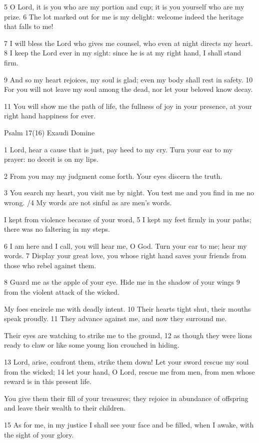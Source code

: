5 O Lord, it is you who are my portion and cup;
it is you yourself who are my prize.
6 The lot marked out for me is my delight:
welcome indeed the heritage that falls to me!

7 I will bless the Lord who gives me counsel,
who even at night directs my heart.
8 I keep the Lord ever in my sight:
since he is at my right hand, I shall stand firm.

9 And so my heart rejoices, my soul is glad;
even my body shall rest in safety.
10 For you will not leave my soul among the dead,
nor let your beloved know decay.

11 You will show me the path of life,
the fullness of joy in your presence,
at your right hand happiness for ever.


Psalm 17(16) Exaudi Domine

1 Lord, hear a cause that is just,
pay heed to my cry.
Turn your ear to my prayer:
no deceit is on my lips.

2 From you may my judgment come forth.
Your eyes discern the truth.

3 You search my heart, you visit me by night.
You test me and you find in me no wrong.
/4 My words are not sinful as are men's words.

I kept from violence because of your word,
5 I kept my feet firmly in your paths;
there was no faltering in my steps.

6 I am here and I call, you will hear me, O God.
Turn your ear to me; hear my words.
7 Display your great love, you whose right hand saves
your friends from those who rebel against them.

8 Guard me as the apple of your eye.
Hide me in the shadow of your wings
9 from the violent attack of the wicked.

My foes encircle me with deadly intent.
10 Their hearts tight shut, their mouths speak proudly.
11 They advance against me, and now they surround me.

Their eyes are watching to strike me to the ground,
12 as though they were lions ready to claw
or like some young lion crouched in hiding.

13 Lord, arise, confront them, strike them down!
Let your sword rescue my soul from the wicked;
14 let your hand, O Lord, rescue me from men,
from men whose reward is in this present life.

You give them their fill of your treasures;
they rejoice in abundance of offspring
and leave their wealth to their children.

15 As for me, in my justice I shall see your face
and be filled, when I awake, with the sight of your glory.


